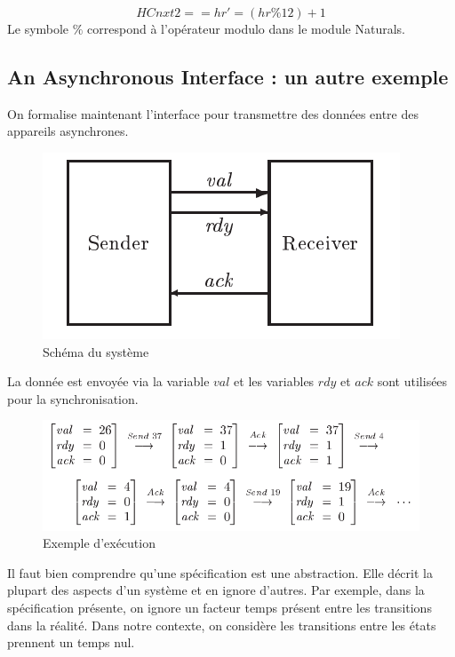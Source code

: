 \documentclass[12pt,a4paper]{article}
\begin{document}
$$ HCnxt2 == hr' = (hr \% 12) + 1 $$
Le symbole $ \% $ correspond à l'opérateur modulo dans le module Naturals. 

\subsection{An Asynchronous Interface : un autre exemple}

On formalise maintenant l'interface pour transmettre des données entre des appareils asynchrones.

\begin{figure}[ht]
	\begin{center}
		\includegraphics[scale=0.7]{schema_async.png}
		\caption{Schéma du système}	
	\end{center}
\end{figure}

La donnée est envoyée via la variable $val$ et les variables $rdy$ et $ack$ sont utilisées pour la synchronisation.

\begin{figure}[ht]
	\begin{center}
		\includegraphics[scale=0.7]{exemple_async.png}
		\caption{Exemple d'exécution}	
	\end{center}
\end{figure}

Il faut bien comprendre qu'une spécification est une abstraction. Elle décrit la plupart des aspects d'un système et en ignore d'autres. Par exemple, dans la spécification présente,  on ignore un facteur temps présent entre les transitions dans la réalité. Dans notre contexte, on considère les transitions entre les états prennent un temps nul.
\end{document}
